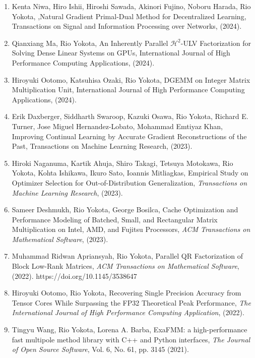 \documentclass[margin,line]{cv}
\begin{document}
\begin{resume}
\begin{enumerate}
\item Kenta Niwa, Hiro Ishii, Hiroshi Sawada, Akinori Fujino, Noboru Harada, Rio Yokota, ,Natural Gradient Primal-Dual Method for Decentralized Learning, Transactions on Signal and Information Processing over Networks, (2024).

\item Qianxiang Ma, Rio Yokota, An Inherently Parallel $\mathcal{H}^2$-ULV Factorization for Solving Dense Linear Systems on GPUs, International Journal of High Performance Computing Applications, (2024).

\item Hiroyuki Ootomo, Katsuhisa Ozaki, Rio Yokota, DGEMM on Integer Matrix Multiplication Unit, International Journal of High Performance Computing Applications, (2024).

\item Erik Daxberger, Siddharth Swaroop, Kazuki Osawa, Rio Yokota, Richard E. Turner, Jose Miguel Hernandez-Lobato, Mohammad Emtiyaz Khan, Improving Continual Learning by Accurate Gradient Reconstructions of the Past, Transactions on Machine Learning Research, (2023).

\item Hiroki Naganuma, Kartik Ahuja, Shiro Takagi, Tetsuya Motokawa, Rio Yokota, Kohta Ishikawa, Ikuro Sato, Ioannis Mitliagkas, Empirical Study on Optimizer Selection for Out-of-Distribution Generalization, \textit{Transactions on Machine Learning Research}, (2023).

\item Sameer Deshmukh, Rio Yokota, George Bosilca, Cache Optimization and Performance Modeling of Batched, Small, and Rectangular Matrix Multiplication on Intel, AMD, and Fujitsu Processors, \textit{ACM Transactions on Mathematical Software}, (2023).

\item Muhammad Ridwan Apriansyah, Rio Yokota, Parallel QR Factorization of Block Low-Rank Matrices, \textit{ACM Transactions on Mathematical Software}, (2022). https://doi.org/10.1145/3538647

\item Hiroyuki Ootomo, Rio Yokota, Recovering Single Precision Accuracy from Tensor Cores While Surpassing the FP32 Theoretical Peak Performance, {\it The International Journal of High Performance Computing Application}, (2022).

\item Tingyu Wang, Rio Yokota, Lorena A. Barba, ExaFMM: a high-performance fast multipole method library with C++ and Python interfaces, {\it The Journal of Open Source Software}, Vol. 6, No. 61, pp. 3145 (2021).


\end{enumerate}
\end{resume}
\end{document}
